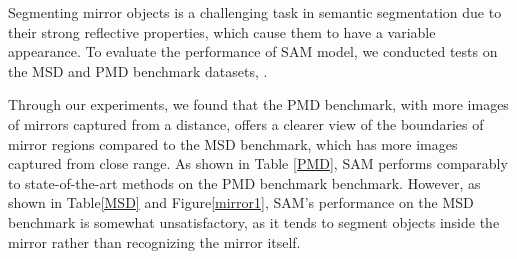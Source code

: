 \documentclass{article}
\begin{document}
Segmenting mirror objects is a challenging task in semantic segmentation due to their strong reflective properties, which cause them to have a variable appearance. To evaluate the performance of SAM model, we conducted tests on the MSD and PMD benchmark datasets, \citep{lin2020progressive}.


Through our experiments, we found that the PMD benchmark, with more images of mirrors captured from a distance, offers a clearer view of the boundaries of mirror regions compared to the MSD benchmark, which has more images captured from close range. As shown in Table \ref{PMD}, SAM performs comparably to state-of-the-art methods on the PMD benchmark benchmark. However, as shown in  Table\ref{MSD} and Figure\ref{mirror1}, SAM's performance on the MSD benchmark is somewhat unsatisfactory, as it tends to segment objects inside the mirror  rather than recognizing the mirror itself.
\end{document}

